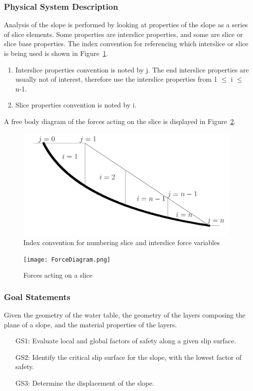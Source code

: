 \documentclass[12pt]{article}
\begin{document}
\subsubsection{Physical System Description}
\label{Sec:PSD}
Analysis of the slope is performed by looking at properties of the slope as a series of slice elements. Some properties are interslice properties, and some are slice or slice base properties. The index convention for referencing which interslice or slice is being used is shown in Figure~\ref{Figure:Icfnsaifv}.
\begin{enumerate}
\item{Interslice properties convention is noted by j. The end interslice properties are usually not of interest, therefore use the interslice properties from 1 $\leq{}$ i $\leq{}$ n-1.}
\item{Slice properties convention is noted by i.}
\end{enumerate}
A free body diagram of the forces acting on the slice is displayed in Figure~\ref{Figure:Faoas}.
\begin{figure}
\begin{center}
\includegraphics{IndexConvention.png}
\caption{Index convention for numbering slice and interslice force variables}
\label{Figure:Icfnsaifv}
\end{center}
\end{figure}
\begin{figure}
\begin{center}
\texttt{[image: ForceDiagram.png]}
\caption{Forces acting on a slice}
\label{Figure:Faoas}
\end{center}
\end{figure}
\subsubsection{Goal Statements}
\label{Sec:GS}
Given the geometry of the water table, the geometry of the layers composing the plane of a slope, and the material properties of the layers.
\begin{itemize}
\item[GS1:]Evaluate local and global factors of safety along a given slip surface.
\item[GS2:]Identify the critical slip surface for the slope, with the lowest factor of safety.
\item[GS3:]Determine the displacement of the slope.
\end{itemize}
\end{document}
